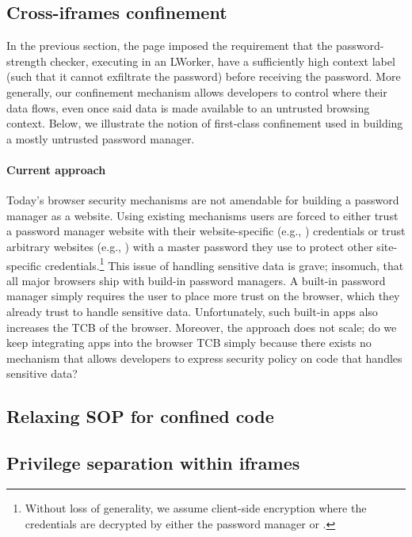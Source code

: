 \subsection{Cross-iframes confinement}
\label{sec:system:iframe}

In the previous section, the  page imposed the
requirement that the password-strength checker, executing in an
LWorker, have a sufficiently high context label (such that it cannot
exfiltrate the password) before receiving the password.
%
More generally, our confinement mechanism allows developers to control
where their data flows, even once said data is made available to an
untrusted browsing context.
%
Below, we illustrate the notion of first-class confinement used
in building a mostly untrusted password manager.

\paragraph{Current approach}
%
Today's browser security mechanisms are not amendable for building a
password manager as a website.
%
Using existing mechanisms users are forced to either trust a password
manager website with their website-specific (e.g., )
credentials or trust arbitrary websites (e.g., ) with a
master password they use to protect other site-specific
credentials.\footnote{
  Without loss of generality, we assume client-side encryption where
  the credentials are decrypted by either the password manager or
  .
}
%
This issue of handling sensitive data is grave; insomuch, that all
major browsers ship with build-in password managers.
%
A built-in password manager simply requires the user to place more
trust on the browser, which they already trust to handle sensitive
data.
%
Unfortunately, such built-in apps also increases the TCB of the
browser.
%
Moreover, the approach does not scale; do we keep integrating apps
into the browser TCB simply because there exists no mechanism that
allows developers to express security policy on code that handles
sensitive data?





\subsection{Relaxing SOP for confined code}
\label{sec:system:mashup}

\subsection{Privilege separation within iframes}
\label{sec:system:script}
